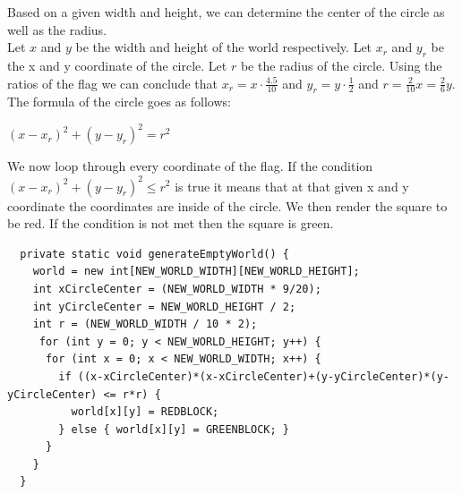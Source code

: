 Based on a given width and height, we can determine the center of the circle as well as the radius. \\
Let \(x\) and \(y\) be the width and height of the world respectively. Let \(x_r\) and \(y_r\) be the x and y coordinate of the circle. Let \(r\) be the radius of the circle. Using the ratios of the flag we can conclude that \(x_r = x \cdot \frac{4.5}{10}\) and \(y_r = y \cdot \frac{1}{2}\) and \(r = \frac{2}{10}x = \frac{2}{6}y\). The formula of the circle goes as follows:
\begin{center}
  \((x - x_r)^2 + (y - y_r)^2 = r^2\)
\end{center}
We now loop through every coordinate of the flag. If the condition \((x - x_r)^2 + (y - y_r)^2 \le r^2\) is true it means that at that given x and y coordinate the coordinates are inside of the circle. We then render the square to be red. If the condition is not met then the square is green.
\begin{lstlisting}
  private static void generateEmptyWorld() {
    world = new int[NEW_WORLD_WIDTH][NEW_WORLD_HEIGHT];
    int xCircleCenter = (NEW_WORLD_WIDTH * 9/20);
    int yCircleCenter = NEW_WORLD_HEIGHT / 2;
    int r = (NEW_WORLD_WIDTH / 10 * 2); 
     for (int y = 0; y < NEW_WORLD_HEIGHT; y++) {
      for (int x = 0; x < NEW_WORLD_WIDTH; x++) {
        if ((x-xCircleCenter)*(x-xCircleCenter)+(y-yCircleCenter)*(y-yCircleCenter) <= r*r) {
          world[x][y] = REDBLOCK;
        } else { world[x][y] = GREENBLOCK; }
      }
    }
  }
\end{lstlisting}